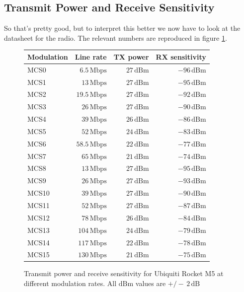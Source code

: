 \subsection{Transmit Power and Receive Sensitivity}
So that's pretty good, but to interpret this better we now have to
look at the datasheet for the radio. The relevant numbers are
reproduced in figure \ref{fig:rocket_txrx}.
\begin{figure}[h]
  \begin{center}
    \begin{tabular}{lrrr}
      Modulation & Line rate & TX power & RX sensitivity\\
      \hline
      MCS0 & $6.5\, \mathrm{Mbps}$ & $27\, \mathrm{dBm}$ & $-96\,\mathrm{dBm}$\\
      MCS1 & $13\, \mathrm{Mbps}$ & $27\, \mathrm{dBm}$ & $-95\,\mathrm{dBm}$\\
      MCS2 & $19.5\, \mathrm{Mbps}$ & $27\, \mathrm{dBm}$ & $-92\,\mathrm{dBm}$\\
      MCS3 & $26\, \mathrm{Mbps}$ & $27\, \mathrm{dBm}$ & $-90\,\mathrm{dBm}$\\
      MCS4 & $39\, \mathrm{Mbps}$ & $26\, \mathrm{dBm}$ & $-86\,\mathrm{dBm}$\\
      MCS5 & $52\, \mathrm{Mbps}$ & $24\, \mathrm{dBm}$ & $-83\,\mathrm{dBm}$\\
      MCS6 & $58.5\, \mathrm{Mbps}$ & $22\, \mathrm{dBm}$ & $-77\,\mathrm{dBm}$\\
      MCS7 & $65\, \mathrm{Mbps}$ & $21\, \mathrm{dBm}$ & $-74\,\mathrm{dBm}$\\
      MCS8 & $13\, \mathrm{Mbps}$ & $27\, \mathrm{dBm}$ & $-95\,\mathrm{dBm}$\\
      MCS9 & $26\, \mathrm{Mbps}$ & $27\, \mathrm{dBm}$ & $-93\,\mathrm{dBm}$\\
      MCS10 & $39\, \mathrm{Mbps}$ & $27\, \mathrm{dBm}$ & $-90\,\mathrm{dBm}$\\
      MCS11 & $52\, \mathrm{Mbps}$ & $27\, \mathrm{dBm}$ & $-87\,\mathrm{dBm}$\\
      MCS12 & $78\, \mathrm{Mbps}$ & $26\, \mathrm{dBm}$ & $-84\,\mathrm{dBm}$\\
      MCS13 & $104\, \mathrm{Mbps}$ & $24\, \mathrm{dBm}$ & $-79\,\mathrm{dBm}$\\
      MCS14 & $117\, \mathrm{Mbps}$ & $22\, \mathrm{dBm}$ & $-78\,\mathrm{dBm}$\\
      MCS15 & $130\, \mathrm{Mbps}$ & $21\, \mathrm{dBm}$ & $-75\,\mathrm{dBm}$\\
    \end{tabular}
  \end{center}
  \caption{Transmit power and receive sensitivity for Ubiquiti Rocket
    M5 at different modulation rates. All $\mathrm{dBm}$ values are
    $+/-\, 2\, \mathrm{dB}$}
  \label{fig:rocket_txrx}
\end{figure}

